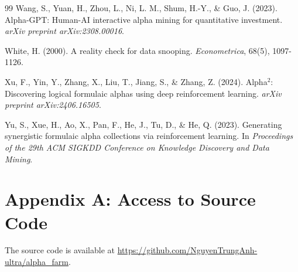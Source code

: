 \documentclass[12pt,a4paper,oneside]{book}
\theoremstyle{definition}
\begin{document}
\begin{thebibliography}{99}
Wang, S., Yuan, H., Zhou, L., Ni, L. M., Shum, H.-Y., \& Guo, J. (2023). Alpha-GPT: Human-AI interactive alpha mining for quantitative investment. \textit{arXiv preprint arXiv:2308.00016}.

White, H. (2000). A reality check for data snooping. \textit{Econometrica}, 68(5), 1097-1126.

Xu, F., Yin, Y., Zhang, X., Liu, T., Jiang, S., \& Zhang, Z. (2024). Alpha$^2$: Discovering logical formulaic alphas using deep reinforcement learning. \textit{arXiv preprint arXiv:2406.16505}.

Yu, S., Xue, H., Ao, X., Pan, F., He, J., Tu, D., \& He, Q. (2023). Generating synergistic formulaic alpha collections via reinforcement learning. In \textit{Proceedings of the 29th ACM SIGKDD Conference on Knowledge Discovery and Data Mining}.

\end{thebibliography}

\newpage

\appendix
\section*{Appendix A: Access to Source Code}

The source code is available at \url{https://github.com/NguyenTrungAnh-ultra/alpha_farm}.
\end{document}
